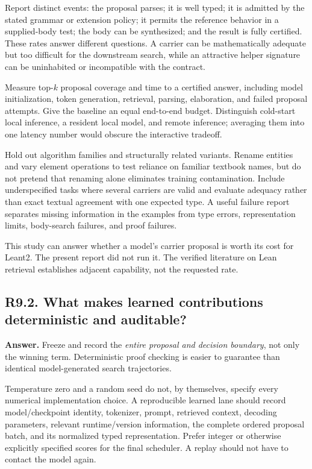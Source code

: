 \documentclass[11pt,a4paper]{article}
\newcommand{\question}[2]{\subsection{#1. #2}\label{q:#1}}
\theoremstyle{definition}
\theoremstyle{remark}
\begin{document}
Report distinct events: the proposal parses; it is well typed; it is admitted by the stated grammar or extension policy; it permits the reference behavior in a supplied-body test; the body can be synthesized; and the result is fully certified. These rates answer different questions. A carrier can be mathematically adequate but too difficult for the downstream search, while an attractive helper signature can be uninhabited or incompatible with the contract.

Measure top-$k$ proposal coverage and time to a certified answer, including model initialization, token generation, retrieval, parsing, elaboration, and failed proposal attempts. Give the baseline an equal end-to-end budget. Distinguish cold-start local inference, a resident local model, and remote inference; averaging them into one latency number would obscure the interactive tradeoff.

Hold out algorithm families and structurally related variants. Rename entities and vary element operations to test reliance on familiar textbook names, but do not pretend that renaming alone eliminates training contamination. Include underspecified tasks where several carriers are valid and evaluate adequacy rather than exact textual agreement with one expected type. A useful failure report separates missing information in the examples from type errors, representation limits, body-search failures, and proof failures.

This study can answer whether a model's carrier proposal is worth its cost for Leant2. The present report did not run it. The verified literature on Lean retrieval establishes adjacent capability, not the requested rate.\cite{leanhammer,leandojo}

\question{R9.2}{What makes learned contributions deterministic and auditable?}

\textbf{Answer.} Freeze and record the \emph{entire proposal and decision boundary}, not only the winning term. Deterministic proof checking is easier to guarantee than identical model-generated search trajectories.

Temperature zero and a random seed do not, by themselves, specify every numerical implementation choice. A reproducible learned lane should record model/checkpoint identity, tokenizer, prompt, retrieved context, decoding parameters, relevant runtime/version information, the complete ordered proposal batch, and its normalized typed representation. Prefer integer or otherwise explicitly specified scores for the final scheduler. A replay should not have to contact the model again.
\end{document}
